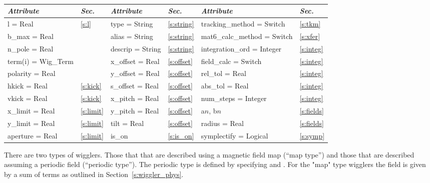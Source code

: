 \toffset
\begin{center}
\tt
\begin{tabular}{|l|l||l|l||l|l|} \hline
  {\sl Attribute} & {\sl Sec.}  & {\sl Attribute} & {\sl Sec.} & {\sl Attribute} & {\sl Sec.} \\ \hline
  l        = Real       & \ref{s:l}      & type = String      & \ref{s:string} & tracking\_method = Switch   & \ref{s:tkm}   \\ \hline
  b\_max   = Real       &                & alias = String     & \ref{s:string} & mat6\_calc\_method = Switch & \ref{s:xfer}  \\ \hline
  n\_pole  = Real       &                & descrip = String   & \ref{s:string} & integration\_ord = Integer  & \ref{s:integ} \\ \hline
  term(i) = Wig\_Term   &                & x\_offset  = Real  & \ref{s:offset} & field\_calc = Switch        & \ref{s:integ} \\ \hline
  polarity = Real       &                & y\_offset  = Real  & \ref{s:offset} & rel\_tol = Real             & \ref{s:integ} \\ \hline
  hkick    = Real       & \ref{s:kick}   & s\_offset  = Real  & \ref{s:offset} & abs\_tol = Real             & \ref{s:integ} \\ \hline
  vkick    = Real       & \ref{s:kick}   & x\_pitch = Real    & \ref{s:offset} & num\_steps = Integer        & \ref{s:integ} \\ \hline
  x\_limit = Real       & \ref{s:limit}  & y\_pitch = Real    & \ref{s:offset} & a$n$, b$n$                  & \ref{s:fields}\\ \hline
  y\_limit = Real       & \ref{s:limit}  & tilt     = Real    & \ref{s:offset} & radius  = Real              & \ref{s:fields}\\ \hline
  aperture = Real       & \ref{s:limit}  & is\_on             & \ref{s:is_on}  & symplectify = Logical       & \ref{s:symp}  \\ \hline
\end{tabular}
\end{center}
\toffset

There are two types of wigglers. Those that that are described using a
magnetic field map (``map type'') and those that are described assuming
a periodic field (``periodic type''). The periodic type is defined by
specifying  and . For the "map" type wigglers the
field is given by a sum of terms as outlined in
Section~\ref{s:wiggler_phys}.


